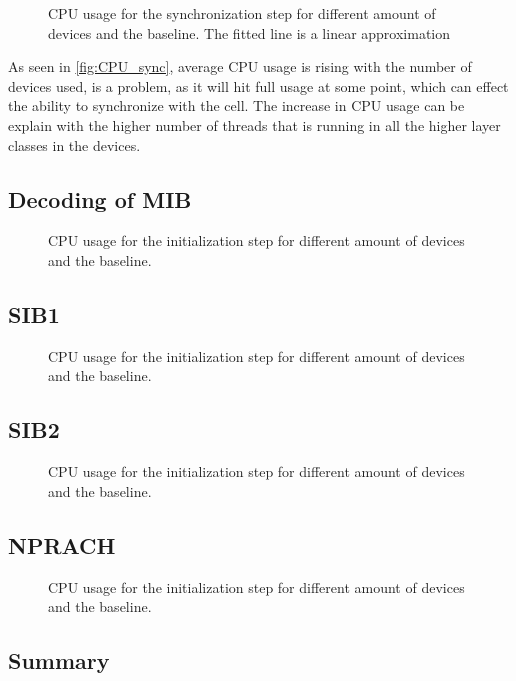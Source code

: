 \begin{figure}[H]
\centering
\resizebox{0.5\textwidth}{!}{
}
\caption{CPU usage for the synchronization step for different amount of devices and the baseline. The fitted line is a linear approximation}
\label{fig:CPU_sync}
\end{figure}

As seen in \autoref{fig:CPU_sync}, average CPU usage is rising with the number of devices used, is a problem, as it will hit full usage at some point, which can effect the ability to synchronize with the cell. The increase in CPU usage can be explain with the higher number of threads that is running in all the higher layer classes in the devices.

\subsection{Decoding of MIB}

\begin{figure}[H]
\centering
\resizebox{0.5\textwidth}{!}{
}
\caption{CPU usage for the initialization step for different amount of devices and the baseline.}
\label{fig:CPU_MIB}
\end{figure}

\subsection{SIB1}

\begin{figure}[H]
\centering
\resizebox{0.5\textwidth}{!}{
}
\caption{CPU usage for the initialization step for different amount of devices and the baseline.}
\label{fig:CPU_SIB1}
\end{figure}

\subsection{SIB2}

\begin{figure}[H]
\centering
\resizebox{0.5\textwidth}{!}{
}
\caption{CPU usage for the initialization step for different amount of devices and the baseline.}
\label{fig:CPU_SIB2}
\end{figure}

\subsection{NPRACH}

\begin{figure}[H]
\centering
\resizebox{0.5\textwidth}{!}{
}
\caption{CPU usage for the initialization step for different amount of devices and the baseline.}
\label{fig:CPU_NPRACH}
\end{figure}

\subsection{Summary}